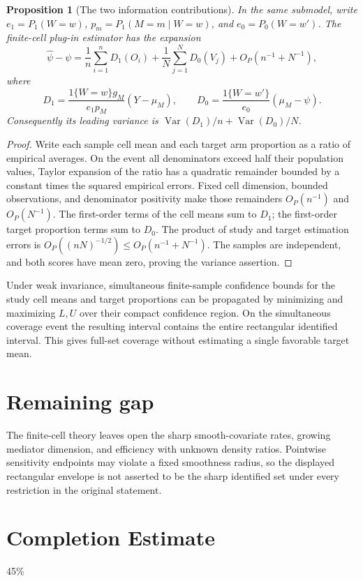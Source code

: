 \documentclass[11pt]{article}
\newtheorem{proposition}[theorem]{Proposition}
\theoremstyle{remark}
\begin{document}
\begin{proposition}[The two information contributions]
In the same submodel, write $e_1=P_1(W=w)$, $p_m=P_1(M=m\mid W=w)$, and $e_0=P_0(W=w')$. The finite-cell plug-in estimator has the expansion
\[
 \widehat\psi-\psi=\frac1n\sum_{i=1}^n D_1(O_i)+\frac1N\sum_{j=1}^N D_0(V_j)
 +O_P(n^{-1}+N^{-1}),
\]
where
\[
 D_1=\frac{1\{W=w\}g_M}{e_1p_M}(Y-\mu_M),\qquad
 D_0=\frac{1\{W=w'\}}{e_0}(\mu_M-\psi).
\]
Consequently its leading variance is $\operatorname{Var}(D_1)/n+\operatorname{Var}(D_0)/N$.
\end{proposition}
\begin{proof}
Write each sample cell mean and each target arm proportion as a ratio of empirical averages. On the event all denominators exceed half their population values, Taylor expansion of the ratio has a quadratic remainder bounded by a constant times the squared empirical errors. Fixed cell dimension, bounded observations, and denominator positivity make those remainders $O_P(n^{-1})$ and $O_P(N^{-1})$. The first-order terms of the cell means sum to $D_1$; the first-order target proportion terms sum to $D_0$. The product of study and target estimation errors is $O_P((nN)^{-1/2})\le O_P(n^{-1}+N^{-1})$. The samples are independent, and both scores have mean zero, proving the variance assertion.
\end{proof}
Under weak invariance, simultaneous finite-sample confidence bounds for the study cell means and target proportions can be propagated by minimizing and maximizing $L,U$ over their compact confidence region. On the simultaneous coverage event the resulting interval contains the entire rectangular identified interval. This gives full-set coverage without estimating a single favorable target mean.

\section*{Remaining gap}
The finite-cell theory leaves open the sharp smooth-covariate rates, growing mediator dimension, and efficiency with unknown density ratios. Pointwise sensitivity endpoints may violate a fixed smoothness radius, so the displayed rectangular envelope is not asserted to be the sharp identified set under every restriction in the original statement.

\section{Completion Estimate}
45\%
\end{document}
